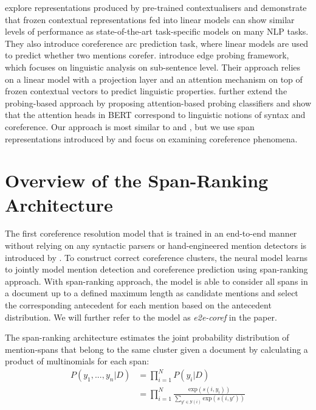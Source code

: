 \documentclass[11pt]{article}
\begin{document}
\textcite{liu2019linguistic} explore representations produced by pre-trained contextualisers and demonstrate that frozen contextual representations fed into linear models can show similar levels of performance as state-of-the-art task-specific models on many NLP tasks. They also introduce coreference arc prediction task, where linear models are used to predict whether two mentions corefer. \textcite{tenney2019context} introduce edge probing framework, which focuses on linguistic analysis on sub-sentence level. Their approach relies on a linear model with a projection layer and an attention mechanism on top of frozen contextual vectors to predict linguistic properties. \textcite{clark2019what} further extend the probing-based approach by proposing attention-based probing classifiers and show that the attention heads in BERT correspond to linguistic notions of syntax and coreference. Our approach is most similar to \textcite{liu2019linguistic} and \textcite{tenney2019context}, but we use span representations introduced by \textcite{lee2017end} and focus on examining coreference phenomena.




\section{Overview of the Span-Ranking Architecture}
The first coreference resolution model that is trained in an end-to-end manner without relying on any syntactic parsers or hand-engineered mention detectors is introduced by \textcite{lee2017end}. To construct correct coreference clusters, the neural model learns to jointly model mention detection and coreference prediction using span-ranking approach.  With span-ranking approach, the model is able to consider all spans in a document up to a defined maximum length as candidate mentions and select the corresponding antecedent for each mention based on the antecedent distribution. We will further refer to the model as \textit{e2e-coref} in the paper.

The span-ranking architecture estimates the joint probability distribution of mention-spans that belong to the same cluster given a document by calculating a product of multinomials for each span:
\begin{align}
P(y_{1}, ..., y_{n}|D) &= \prod\limits_{i=1}^{N} P(y_{i}|D) \\
&= \prod\limits_{i=1}^{N} \frac{\text{exp}(s(i, y_{i}))}{\sum_{y' \in \mathcal{Y}(i)} \text{exp}(s(i, y'))}
\end{align}
\end{document}
